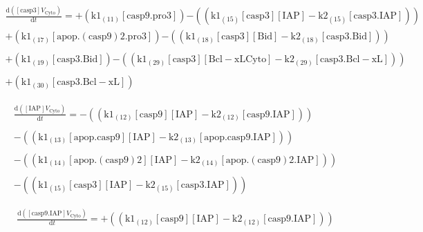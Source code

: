 \documentclass[a4paper,12pt]{article} %
\newcommand{\M}[1]{\mathrm{#1}}
\begin{document}
\begin{equation}
\begin{split}
\frac {\M{d}( {{\M{[casp3]}}    {V}_{\M{Cyto}} } ) }  {\M{d}{t} }  =  {  +  ( {{\M{k1}}_{\M{(11)}}    {\M{[casp9.pro3]}} } ) } 
   {  -  (( {{\M{k1}}_{\M{(15)}}    {\M{[casp3]}}    {\M{[IAP]}}  -  {\M{k2}}_{\M{(15)}}    {\M{[casp3.IAP]}} } )) } \\
   {  +  ( {{\M{k1}}_{\M{(17)}}    {\M{[apop.(casp9)2.pro3]}} } ) } 
   {  -  (( {{\M{k1}}_{\M{(18)}}    {\M{[casp3]}}    {\M{[Bid]}}  -  {\M{k2}}_{\M{(18)}}    {\M{[casp3.Bid]}} } )) } \\ 
  \\ 
   {  +  ( {{\M{k1}}_{\M{(19)}}    {\M{[casp3.Bid]}} } ) } 
   {  -  (( {{\M{k1}}_{\M{(29)}}    {\M{[casp3]}}    {\M{[Bcl-xL{Cyto}]}}  -  {\M{k2}}_{\M{(29)}}    {\M{[casp3.Bcl-xL]}} } )) } \\ 
  \\ 
   {  +  ( {{\M{k1}}_{\M{(30)}}    {\M{[casp3.Bcl-xL]}} } ) } 
\end{split}
\end{equation}


\begin{equation}
\begin{split}
\frac {\M{d}( {{\M{[IAP]}}    {V}_{\M{Cyto}} } ) }  {\M{d}{t} }  =  {  -  (( {{\M{k1}}_{\M{(12)}}    {\M{[casp9]}}    {\M{[IAP]}}  -  {\M{k2}}_{\M{(12)}}    {\M{[casp9.IAP]}} } )) } \\ 
  \\ 
   {  -  (( {{\M{k1}}_{\M{(13)}}    {\M{[apop.casp9]}}    {\M{[IAP]}}  -  {\M{k2}}_{\M{(13)}}    {\M{[apop.casp9.IAP]}} } )) } \\ 
  \\ 
   {  -  (( {{\M{k1}}_{\M{(14)}}    {\M{[apop.(casp9)2]}}    {\M{[IAP]}}  -  {\M{k2}}_{\M{(14)}}    {\M{[apop.(casp9)2.IAP]}} } )) } \\ 
  \\ 
   {  -  (( {{\M{k1}}_{\M{(15)}}    {\M{[casp3]}}    {\M{[IAP]}}  -  {\M{k2}}_{\M{(15)}}    {\M{[casp3.IAP]}} } )) }
\end{split}
\end{equation}


\begin{equation}
\begin{split}
\frac {\M{d}( {{\M{[casp9.IAP]}}    {V}_{\M{Cyto}} } ) }  {\M{d}{t} }  =  {  +  (( {{\M{k1}}_{\M{(12)}}    {\M{[casp9]}}    {\M{[IAP]}}  -  {\M{k2}}_{\M{(12)}}    {\M{[casp9.IAP]}} } )) }
\end{split}
\end{equation}
\end{document}
